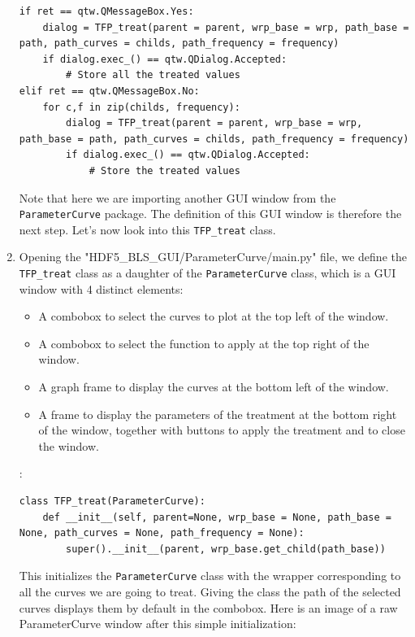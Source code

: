 \documentclass{book}
\begin{document}
\begin{enumerate}
\begin{lstlisting}
if ret == qtw.QMessageBox.Yes: 
    dialog = TFP_treat(parent = parent, wrp_base = wrp, path_base = path, path_curves = childs, path_frequency = frequency)
    if dialog.exec_() == qtw.QDialog.Accepted:
        # Store all the treated values
elif ret == qtw.QMessageBox.No:
    for c,f in zip(childs, frequency):
        dialog = TFP_treat(parent = parent, wrp_base = wrp, path_base = path, path_curves = childs, path_frequency = frequency)
        if dialog.exec_() == qtw.QDialog.Accepted:
            # Store the treated values
\end{lstlisting}
        Note that here we are importing another GUI window from the \texttt{ParameterCurve} package. The definition of this GUI window is therefore the next step. Let's now look into this \texttt{TFP\_treat} class.
        \item Opening the "HDF5\_BLS\_GUI/ParameterCurve/main.py" file, we define the \texttt{TFP\_treat} class as a daughter of the \texttt{ParameterCurve} class, which is a GUI window with 4 distinct elements:
        \begin{itemize}
            \item A combobox to select the curves to plot at the top left of the window.
            \item A combobox to select the function to apply at the top right of the window.
            \item A graph frame to display the curves at the bottom left of the window.
            \item A frame to display the parameters of the treatment at the bottom right of the window, together with buttons to apply the treatment and to close the window.
        \end{itemize}:
\begin{lstlisting}
class TFP_treat(ParameterCurve):
    def __init__(self, parent=None, wrp_base = None, path_base = None, path_curves = None, path_frequency = None):
        super().__init__(parent, wrp_base.get_child(path_base))
\end{lstlisting}
        This initializes the \texttt{ParameterCurve} class with the wrapper corresponding to all the curves we are going to treat. Giving the class the path of the selected curves displays them by default in the combobox.
        Here is an image of a raw ParameterCurve window after this simple initialization:
        \begin{center}

\end{center}
\end{enumerate}
\end{document}
